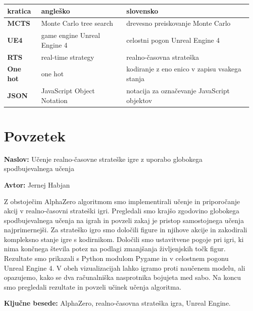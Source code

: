 \documentclass[a4paper, 12pt]{book}
\newcommand{\ttitle}{Učenje realno-časovne strateške igre z uporabo globokega spodbujevalnega učenja}
\newcommand{\tauthor}{Jernej Habjan}
\newcommand{\tkeywords}{AlphaZero, realno-časovna strateška igra, Unreal Engine}
\newcommand{\clearemptydoublepage}{\newpage{\pagestyle{empty}\cleardoublepage}}
\begin{document}
\noindent\begin{tabular}{p{}|p{}|p{}}    %
	{\bf kratica} & {\bf angleško} & {\bf slovensko} \\ \hline
	{\bf MCTS} & Monte Carlo tree search & drevesno preiskovanje Monte Carlo \\
	{\bf UE4} & game engine Unreal Engine 4 & celostni pogon Unreal Engine 4 \\
	{\bf RTS} & real-time strategy & realno-časovna strateška\\
	{\bf One hot} & one hot & kodiranje z eno enico v zapisu vsakega stanja  \\
	{\bf JSON} & JavaScript Object Notation & notacija za označevanje JavaScript objektov \\
\end{tabular}


\clearemptydoublepage

\chapter*{Povzetek}

\noindent\textbf{Naslov:} \ttitle
\bigskip

\noindent\textbf{Avtor:} \tauthor
\bigskip

\noindent 
Z obstoječim AlphaZero algoritmom smo implementirali učenje in priporočanje akcij v realno-časovni strateški igri.
Pregledali smo krajšo zgodovino globokega spodbujevalnega učenja na igrah in povzeli zakaj je pristop samostojnega učenja najprimernejši.
Za strateško igro smo določili figure in njihove akcije in zakodirali kompleksno stanje igre s kodirnikom.
Določili smo ustavitvene pogoje pri igri, ki nima končnega števila potez na podlagi zmanjšanja življenjskih točk figur.
Rezultate smo prikazali s Python modulom Pygame in v celostnem pogonu Unreal Engine 4. 
V obeh vizualizacijah lahko igramo proti naučenem modelu, ali opazujemo, kako se dva računalniška nasprotnika bojujeta med sabo.
Na koncu smo pregledali rezultate in povzeli učinek učenja algoritma.
\bigskip

\noindent\textbf{Ključne besede:} \tkeywords.
\clearemptydoublepage

\end{document}
